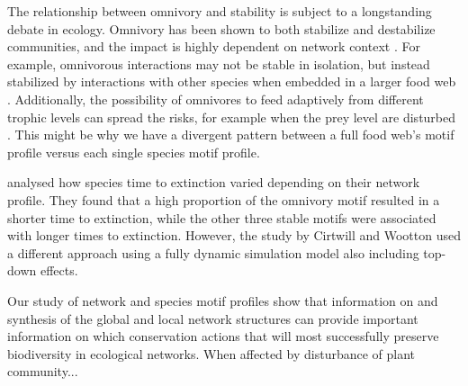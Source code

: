 \documentclass[12pt]{article}
\begin{document}
\begin{spacing}{2.0}
The relationship between omnivory and stability is subject to a longstanding debate in ecology. Omnivory has been shown to both stabilize and destabilize communities, and the impact is highly dependent on network context \citep{bascompte2005simple, Monteiro2016, Kratina2012}. 
For example, omnivorous interactions may not be stable in isolation, but instead stabilized by interactions with other species when embedded in a larger food web \citep{Kratinaetal2012}. Additionally, the possibility of omnivores to feed adaptively from different trophic levels can spread the risks, for example when the prey level are disturbed \citep{Fagan1997}.
This might be why we have a divergent pattern between a full food web's motif profile versus each single species motif profile.

 \cite{Cirtwill2021_inprep} analysed how species time to extinction varied depending on their network profile. They found that a high proportion of the omnivory motif resulted in a shorter time to extinction, while the other three stable motifs were associated with longer times to extinction. However, the study by Cirtwill and Wootton used a different approach using a fully dynamic simulation model also including top-down effects. 
 
Our study of network and species motif profiles show that information on and synthesis of the global and local network structures can provide important information on which conservation actions that will most successfully preserve biodiversity in ecological networks. When affected by disturbance of plant community... 


    
    

\end{spacing}
\end{document}
